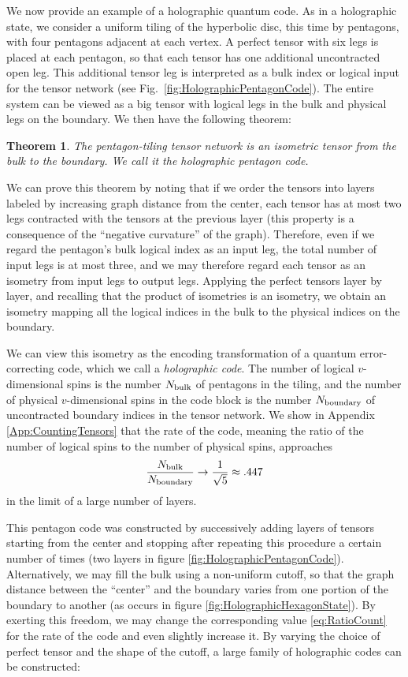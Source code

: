 \documentclass[12pt]{article}
\theoremstyle{plain}
\newtheorem{theorem}{Theorem}
\theoremstyle{plain}
\theoremstyle{plain}
\theoremstyle{plain}
\theoremstyle{result}
\theoremstyle{remark}
\theoremstyle{conjecture}
\theoremstyle{observation}
\theoremstyle{definition}
\theoremstyle{corollary}
\theoremstyle{definition}
\theoremstyle{definition}
\theoremstyle{assumption}
\theoremstyle{definition}
\theoremstyle{problem}
\theoremstyle{fact}
\begin{document}
We now provide an example of a holographic quantum code.
 As in a holographic state, we consider a uniform tiling of the hyperbolic disc, this time by pentagons, with four pentagons adjacent at each vertex. 
A perfect tensor with six legs is placed at each pentagon, so that each tensor has one additional uncontracted open leg. 
This additional tensor leg is interpreted as a bulk index or logical input for the tensor network (see Fig.~\ref{fig:HolographicPentagonCode}). 
The entire system can be viewed as a big tensor with logical legs in the bulk and physical legs on the boundary. We then have the following theorem:
\begin{theorem}
The pentagon-tiling tensor network is an isometric tensor from the bulk to the boundary. 
We call it the holographic pentagon code.
\end{theorem}
We can prove this theorem by noting that if we order the tensors into layers labeled by increasing graph distance from the center, each tensor has at most two legs contracted with the tensors at the previous layer (this property is a consequence of the ``negative curvature'' of the graph).  Therefore, even if we regard the pentagon's bulk logical index as an input leg, the total number of input legs is at most three, and we may therefore regard each tensor as an isometry from input legs to output legs. 
Applying the perfect tensors layer by layer, and recalling that the product of isometries is an isometry, we obtain an isometry mapping all the logical indices in the bulk to the physical indices on the boundary.

We can view this isometry as the encoding transformation of a quantum error-correcting code, which we call a \emph{holographic code}. 
The number of logical $v$-dimensional spins is the number $N_{\rm bulk}$ of pentagons in the tiling, and the number of physical $v$-dimensional spins in the code block is the number $N_{\rm boundary}$ of uncontracted boundary indices in the tensor network. 
We show in Appendix \ref{App:CountingTensors} that the rate of the code, meaning the ratio of the number of logical spins to the number of physical spins, approaches
\begin{align}\label{eq:RatioCount}
\frac{N_{\rm bulk}}{N_{\rm boundary}}\to \frac{1}{\sqrt{5}}\approx .447
\end{align}
in the limit of a large number of layers.

This pentagon code was constructed by successively adding layers of tensors starting from the center and stopping after repeating this procedure a certain number of times (two layers in figure \ref{fig:HolographicPentagonCode}). 
 Alternatively, we may fill the bulk using a non-uniform cutoff, so that the graph distance between the ``center'' and the boundary varies from one portion of the boundary to another (as occurs in figure \ref{fig:HolographicHexagonState}). 
By exerting this freedom, we may change the corresponding value \ref{eq:RatioCount}  for the rate of the code and even slightly increase it.
 By varying the choice of perfect tensor and the shape of the cutoff, a large family of holographic codes can be constructed:
\end{document}
